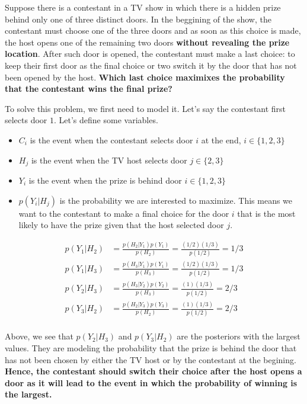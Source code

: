 \documentclass{article}
\begin{document}
\begin{question}
	Suppose there is a contestant in a TV show in which there is a hidden prize behind only one of three distinct doors. In the beggining of the show, the contestant must choose one of the three doors and as soon as this choice is made, the host opens one of the remaining two doors \textbf{without revealing the prize location}. After such door is opened, the contestant must make a last choice: to keep their first door as the final choice or two switch it by the door that has not been opened by the host. \textbf{Which last choice maximixes the probability that the contestant wins the final prize?}
	
	To solve this problem, we first need to model it. Let's say the contestant first selects door $1$. Let's define some variables.
	
	\begin{itemize}
		\item  $C_i$ is the event when the contestant selects door $i$ at the end, $i \in \{1,2,3\}$
		\item  $H_j$ is the event when the TV host selects door $j \in \{2,3\}$
		\item $Y_i$ is the event when the prize is behind door $i \in \{1,2,3\}$
		\item $p(Y_i | H_j)$ is the probability we are interested to maximize. This means we want to the contestant to make a final choice for the door $i$ that is the most likely to have the prize given that the host selected door $j$.
	\end{itemize}
	
	\begin{align}
		 p(Y_1 | H_2) &= \frac{p(H_2 | Y_1) p(Y_1)}{p(H_2)} = \frac{(1/2) (1/3)}{p(1/2)} = 1/3 \\
		 p(Y_1 | H_3) &= \frac{p(H_3 | Y_1) p(Y_1)}{p(H_3)} = \frac{(1/2) (1/3)}{p(1/2)} = 1/3 \\
		 p(Y_2 | H_3) &= \frac{p(H_3 | Y_2) p(Y_2)}{p(H_3)} = \frac{(1) (1/3)}{p(1/2)} = 2/3 \\
		 p(Y_3 | H_2) &= \frac{p(H_2 | Y_3) p(Y_3)}{p(H_2)} = \frac{(1) (1/3)}{p(1/2)} = 2/3 \\
	\end{align}
	
	Above, we see that $p(Y_2 | H_3)$ and $p(Y_3 | H_2)$ are the posteriors with the largest values. They are modeling the probability that the prize is behind the door that has not been chosen by either the TV host or by the contestant at the begining. \textbf{Hence, the contestant should switch their choice after the host opens a door as it will lead to the event in which the probability of winning is the largest. }
\end{question}
\end{document}

